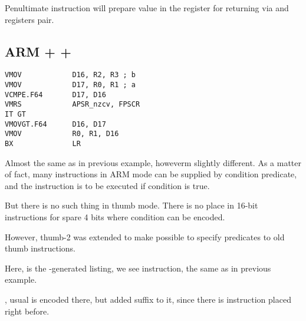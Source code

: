 {Penultimate instruction  will prepare value in the  register for returning via  and 
registers pair.}

\subsection{ARM + \OptimizingXcode + \ThumbTwoMode}

\begin{lstlisting}[caption=\OptimizingXcode + \ThumbTwoMode]
VMOV            D16, R2, R3 ; b
VMOV            D17, R0, R1 ; a
VCMPE.F64       D17, D16
VMRS            APSR_nzcv, FPSCR
IT GT 
VMOVGT.F64      D16, D17
VMOV            R0, R1, D16
BX              LR
\end{lstlisting}

{Almost the same as in previous example, howeverm slightly different.}
{As a matter of fact, many instructions in ARM mode can be supplied by condition predicate,
and the instruction is to be executed if condition is true.}

{But there is no such thing in thumb mode}. 
{There is no place in 16-bit instructions for spare 4 bits where condition can be encoded.}

{However, thumb-2 was extended to make possible to specify predicates to old thumb instructions.}

{Here, is the \IDA-generated listing, we see  instruction, the same as in previous example.}

, 
{usual  is encoded there}, 
{but \IDA added  suffix to it}, 
{since there is  instruction placed right before}.

